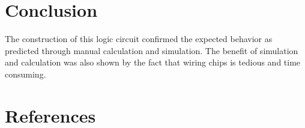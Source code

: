 \documentclass[12pt]{article}
\begin{document}
\clearpage
\section{Conclusion}

The construction of this logic circuit confirmed the expected behavior
as predicted through manual calculation and simulation.
The benefit of simulation and calculation was also shown by the
fact that wiring chips is tedious and time consuming.


\renewcommand*{\refname}{\vspace{-8mm}}
\section{References}
%
%



\end{document}
